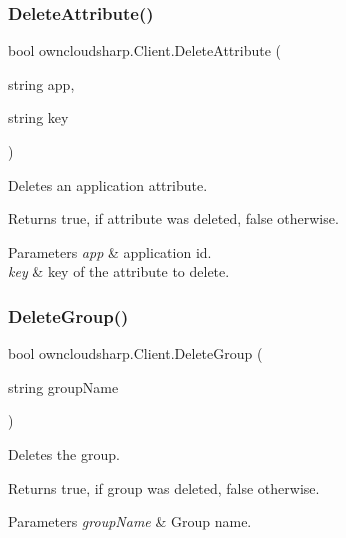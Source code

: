\subsubsection{\texorpdfstring{Delete\+Attribute()}{DeleteAttribute()}}
{\footnotesize\ttfamily bool owncloudsharp.\+Client.\+Delete\+Attribute (\begin{DoxyParamCaption}\item[{string}]{app,  }\item[{string}]{key }\end{DoxyParamCaption})}



Deletes an application attribute. 

\begin{DoxyReturn}{Returns}
{\ttfamily true}, if attribute was deleted, {\ttfamily false} otherwise.
\end{DoxyReturn}

\begin{DoxyParams}{Parameters}
{\em app} & application id.\\
\hline
{\em key} & key of the attribute to delete.\\
\hline
\end{DoxyParams}
\mbox{\label{classowncloudsharp_1_1_client_a83390a9710020ecc7513dd03a23e192f}} 
\subsubsection{\texorpdfstring{Delete\+Group()}{DeleteGroup()}}
{\footnotesize\ttfamily bool owncloudsharp.\+Client.\+Delete\+Group (\begin{DoxyParamCaption}\item[{string}]{group\+Name }\end{DoxyParamCaption})}



Deletes the group. 

\begin{DoxyReturn}{Returns}
{\ttfamily true}, if group was deleted, {\ttfamily false} otherwise.
\end{DoxyReturn}

\begin{DoxyParams}{Parameters}
{\em group\+Name} & Group name.\\
\hline
\end{DoxyParams}
\mbox{\label{classowncloudsharp_1_1_client_a7499d8f0c4fae0b22da4a35327547cca}} 
